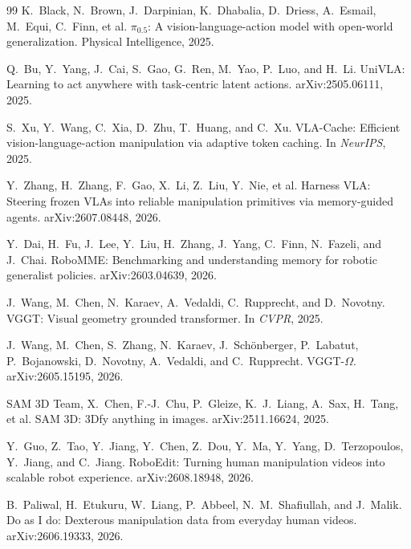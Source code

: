 \documentclass[11pt]{article}
\begin{document}
\begin{thebibliography}{99}
K.~Black, N.~Brown, J.~Darpinian, K.~Dhabalia, D.~Driess, A.~Esmail, M.~Equi, C.~Finn, et al.
\newblock $\pi_{0.5}$: A vision-language-action model with open-world generalization.
\newblock Physical Intelligence, 2025.

Q.~Bu, Y.~Yang, J.~Cai, S.~Gao, G.~Ren, M.~Yao, P.~Luo, and H.~Li.
\newblock UniVLA: Learning to act anywhere with task-centric latent actions.
\newblock arXiv:2505.06111, 2025.

S.~Xu, Y.~Wang, C.~Xia, D.~Zhu, T.~Huang, and C.~Xu.
\newblock VLA-Cache: Efficient vision-language-action manipulation via adaptive token caching.
\newblock In \textit{NeurIPS}, 2025.

Y.~Zhang, H.~Zhang, F.~Gao, X.~Li, Z.~Liu, Y.~Nie, et al.
\newblock Harness VLA: Steering frozen VLAs into reliable manipulation primitives via memory-guided agents.
\newblock arXiv:2607.08448, 2026.

Y.~Dai, H.~Fu, J.~Lee, Y.~Liu, H.~Zhang, J.~Yang, C.~Finn, N.~Fazeli, and J.~Chai.
\newblock RoboMME: Benchmarking and understanding memory for robotic generalist policies.
\newblock arXiv:2603.04639, 2026.

J.~Wang, M.~Chen, N.~Karaev, A.~Vedaldi, C.~Rupprecht, and D.~Novotny.
\newblock VGGT: Visual geometry grounded transformer.
\newblock In \textit{CVPR}, 2025.

J.~Wang, M.~Chen, S.~Zhang, N.~Karaev, J.~Sch\"onberger, P.~Labatut, P.~Bojanowski, D.~Novotny, A.~Vedaldi, and C.~Rupprecht.
\newblock VGGT-$\Omega$.
\newblock arXiv:2605.15195, 2026.

SAM 3D Team, X.~Chen, F.-J.~Chu, P.~Gleize, K.~J.~Liang, A.~Sax, H.~Tang, et al.
\newblock SAM 3D: 3Dfy anything in images.
\newblock arXiv:2511.16624, 2025.

Y.~Guo, Z.~Tao, Y.~Jiang, Y.~Chen, Z.~Dou, Y.~Ma, Y.~Yang, D.~Terzopoulos, Y.~Jiang, and C.~Jiang.
\newblock RoboEdit: Turning human manipulation videos into scalable robot experience.
\newblock arXiv:2608.18948, 2026.

B.~Paliwal, H.~Etukuru, W.~Liang, P.~Abbeel, N.~M.~Shafiullah, and J.~Malik.
\newblock Do as I do: Dexterous manipulation data from everyday human videos.
\newblock arXiv:2606.19333, 2026.


\end{thebibliography}
\end{document}
